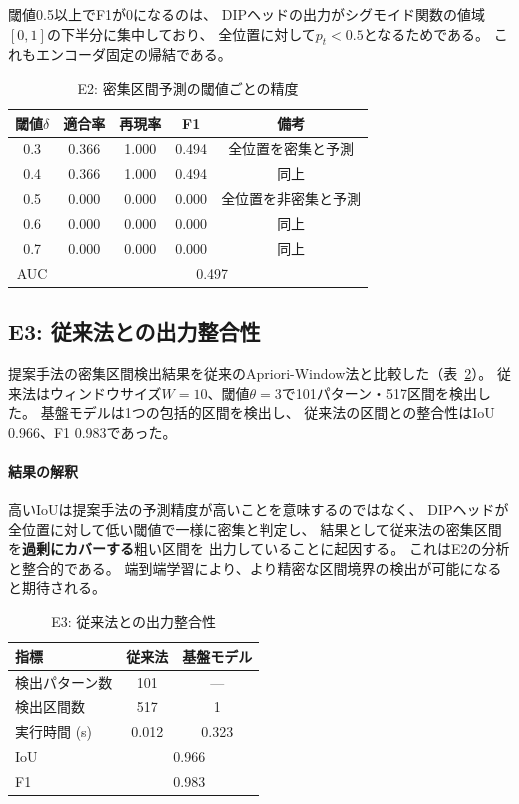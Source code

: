 \documentclass[sigconf,nonacm]{acmart}
\begin{document}
閾値0.5以上でF1が0になるのは、
DIPヘッドの出力がシグモイド関数の値域$[0,1]$の下半分に集中しており、
全位置に対して$p_t < 0.5$となるためである。
これもエンコーダ固定の帰結である。

\begin{table}[t]
\centering
\caption{E2: 密集区間予測の閾値ごとの精度}
\label{tab:e2}
\begin{tabular}{ccccc}
\toprule
閾値$\delta$ & 適合率 & 再現率 & F1 & 備考 \\
\midrule
0.3 & 0.366 & 1.000 & 0.494 & 全位置を密集と予測 \\
0.4 & 0.366 & 1.000 & 0.494 & 同上 \\
0.5 & 0.000 & 0.000 & 0.000 & 全位置を非密集と予測 \\
0.6 & 0.000 & 0.000 & 0.000 & 同上 \\
0.7 & 0.000 & 0.000 & 0.000 & 同上 \\
\midrule
AUC & \multicolumn{4}{c}{0.497} \\
\bottomrule
\end{tabular}
\end{table}

\subsection{E3: 従来法との出力整合性}

提案手法の密集区間検出結果を従来のApriori-Window法と比較した（表~\ref{tab:e3}）。
従来法はウィンドウサイズ$W=10$、閾値$\theta=3$で101パターン・517区間を検出した。
基盤モデルは1つの包括的区間を検出し、
従来法の区間との整合性はIoU 0.966、F1 0.983であった。

\paragraph{結果の解釈}
高いIoUは提案手法の予測精度が高いことを意味するのではなく、
DIPヘッドが全位置に対して低い閾値で一様に密集と判定し、
結果として従来法の密集区間を\textbf{過剰にカバーする}粗い区間を
出力していることに起因する。
これはE2の分析と整合的である。
端到端学習により、より精密な区間境界の検出が可能になると期待される。

\begin{table}[t]
\centering
\caption{E3: 従来法との出力整合性}
\label{tab:e3}
\begin{tabular}{lcc}
\toprule
指標 & 従来法 & 基盤モデル \\
\midrule
検出パターン数 & 101 & --- \\
検出区間数 & 517 & 1 \\
実行時間 (s) & 0.012 & 0.323 \\
\midrule
IoU & \multicolumn{2}{c}{0.966} \\
F1 & \multicolumn{2}{c}{0.983} \\
\bottomrule
\end{tabular}
\end{table}
\end{document}
